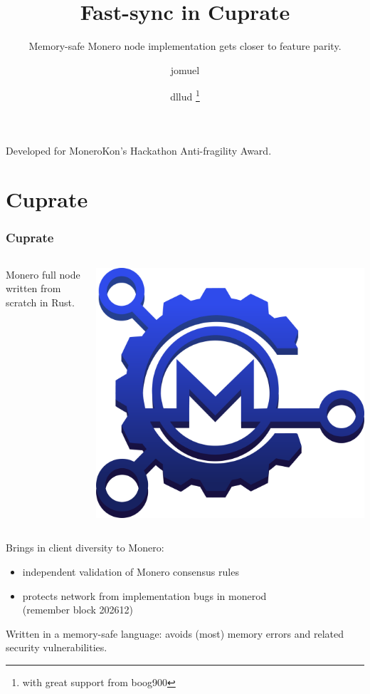 \documentclass[aspectratio=169]{beamer}
\title[Fast-sync in Cuprate]{Fast-sync in Cuprate}
\subtitle{Memory-safe Monero node implementation gets closer to feature parity.}
\author{jomuel \and dllud \thanks{\footnotesize with great support from boog900}}
\date{}
\begin{document}
\begin{frame}
  \maketitle
  Developed for MoneroKon's Hackathon Anti-fragility Award.
\end{frame}

\section{Cuprate}
\begin{frame}[fragile]
  \frametitle{Cuprate}
  \begin{columns}
    \begin{column}{0.8\textwidth}
      Monero full node written from scratch in Rust.
    \end{column}
    \begin{column}{0.2\textwidth}
      \includegraphics[width=\textwidth]{cuprate-logo}
    \end{column}
  \end{columns}
  \vspace{2\baselineskip}
  Brings in client diversity to Monero:
  \begin{itemize}
    \item independent validation of Monero consensus rules
    \item protects network from implementation bugs in monerod\\
      (remember block 202612)
  \end{itemize}
  \vspace{2\baselineskip}
  Written in a memory-safe language: avoids (most) memory errors and related security vulnerabilities.
\end{frame}
\end{document}
